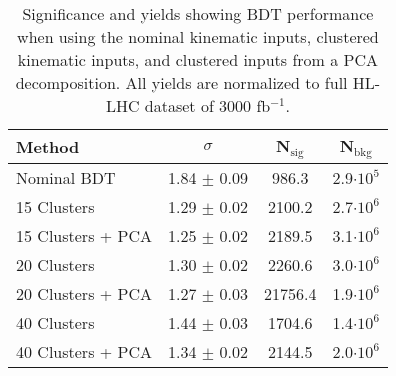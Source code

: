 \begin{table}[h!]
\label{tab:bdtPCACluster}
\begin{center}
    \begin{tabular}{|l|c|c|c|} %
      \hline\hline
      \textbf{Method} & $\sigma$ & N$_{\textrm{sig}}$ & N$_{\textrm{bkg}}$ \\
      \hline
      Nominal BDT & 1.84 $\pm$ 0.09 & 986.3  & 2.9$\cdot 10^5$ \\
      15 Clusters & 1.29 $\pm$ 0.02 & 2100.2 & 2.7$\cdot 10^6$ \\
      15 Clusters + PCA & 1.25 $\pm$ 0.02 & 2189.5 & 3.1$\cdot 10^6$ \\         
      20 Clusters & 1.30 $\pm$ 0.02 & 2260.6 & 3.0$\cdot 10^6$ \\
      20 Clusters + PCA & 1.27 $\pm$ 0.03 & 21756.4 & 1.9$\cdot 10^6$ \\         
      40 Clusters & 1.44 $\pm$ 0.03 & 1704.6 & 1.4$\cdot 10^6$ \\
      40 Clusters + PCA & 1.34 $\pm$ 0.02 & 2144.5 & 2.0$\cdot 10^6$ \\         
      \hline\hline
    \end{tabular}
    \caption{Significance and yields showing BDT performance when using the nominal kinematic inputs, clustered kinematic inputs, and clustered inputs from a PCA decomposition. All yields are normalized to full HL-LHC dataset of 3000 fb$^{-1}$.}
    \end{center}
\end{table}
